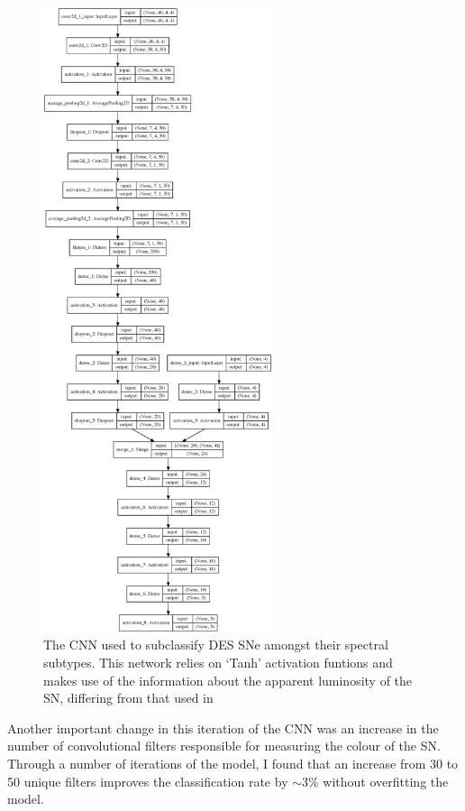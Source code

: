 \begin{figure}
  \centering
  \includegraphics[width=0.6\textwidth]{Figures/Chapter5/SN}
  \caption{The CNN used to subclassify DES SNe amongst their spectral subtypes. This network relies on `Tanh' activation funtions and makes use of the information about the apparent luminosity of the SN, differing from that used in }
  \label{fig:SNClassificationNetwork}
\end{figure}

Another important change in this iteration of the CNN was an increase in the number of convolutional filters responsible for measuring the colour of the SN. Through a number of iterations of the model, I found that an increase from 30 to 50 unique filters improves the classification rate by $\sim$3\% without overfitting the model.


